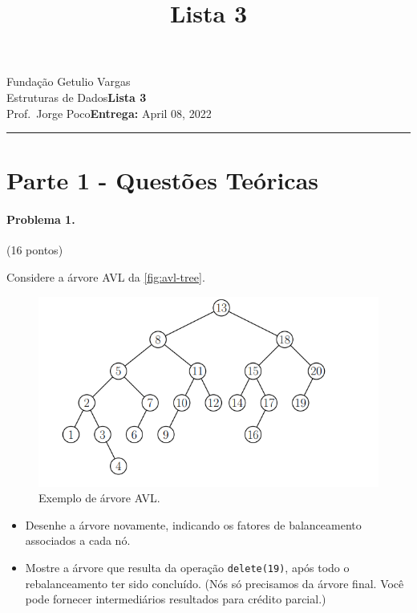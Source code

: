 \documentclass{article}
\title{Lista 3}
\date{}
\newcommand{\assignment}{Lista 3}
\newcommand{\duedate}{April 08, 2022}
\begin{document}
Fundação Getulio Vargas\hfill\\
Estruturas de Dados\hfill\textbf{\assignment}\\
Prof.\ Jorge Poco\hfill\textbf{Entrega:} \duedate\\
\smallskip\hrule\bigskip

{\let\newpage\relax\maketitle}
\maketitle

\section*{Parte 1 - Questões Teóricas}
\paragraph{Problema 1.} (16 pontos)

Considere a árvore AVL da \autoref{fig:avl-tree}.

\begin{figure}[h]
    \centering
    \includegraphics[width = 0.7\linewidth]{figures/fig-1.png}
    \caption{Exemplo de árvore AVL.}
    \label{fig:avl-tree}
\end{figure}

\begin{itemize}
    \item Desenhe a árvore novamente, indicando os fatores de balanceamento associados a cada nó.
    \item Mostre a árvore que resulta da operação \texttt{delete(19)}, após todo o rebalanceamento ter sido concluído. (Nós só precisamos da árvore final. Você pode fornecer intermediários resultados para crédito parcial.) 
\end{itemize}
\end{document}
